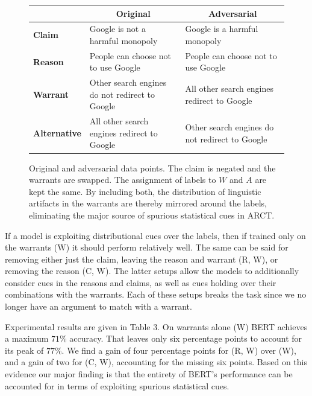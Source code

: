 \documentclass[11pt,a4paper]{article}
\begin{document}
\begin{figure}[t]
\begin{center}
\begin{tabular}{|l|l|l|}
\hline
& \multicolumn{1}{c|}{\small{\textbf{Original}}} &  \multicolumn{1}{c|}{\small{\textbf{Adversarial}}} \\
\hline
\small{\textbf{Claim}} & \small{Google is not a harmful monopoly} & \small{Google is a harmful monopoly} \\
\small{\textbf{Reason}} & \small{People can choose not to use Google} & \small{People can choose not to use Google} \\
\small{\textbf{Warrant}} & \small{Other search engines do not redirect to Google} & \small{All other search engines redirect to Google} \\
\small{\textbf{Alternative}} & \small{All other search engines redirect to Google} & \small{Other search engines do not redirect to Google} \\
\hline
\end{tabular}
\end{center}
\caption{Original and adversarial data points. The claim is negated and the warrants are swapped. The assignment of labels to $W$ and $A$ are kept the same. By including both, the distribution of linguistic artifacts in the warrants are thereby mirrored around the labels, eliminating the major source of spurious statistical cues in ARCT.}
\end{figure}

If a model is exploiting distributional cues over the labels, then if trained only on the warrants (W) it should perform relatively well. The same can be said for removing either just the claim, leaving the reason and warrant (R, W), or removing the reason (C, W). The latter setups allow the models to additionally consider cues in the reasons and claims, as well as cues holding over their combinations with the warrants. Each of these setups breaks the  task since we no longer have an argument to match with a warrant.

Experimental results are given in Table 3. On warrants alone (W) BERT achieves a maximum $71\%$ accuracy. That leaves only six percentage points to account for its peak of $77\%$. We find a gain of four percentage points for (R, W) over (W), and a gain of two for (C, W), accounting for the missing six points. Based on this evidence our major finding is that the entirety of BERT's performance can be accounted for in terms of exploiting spurious statistical cues.
\end{document}
